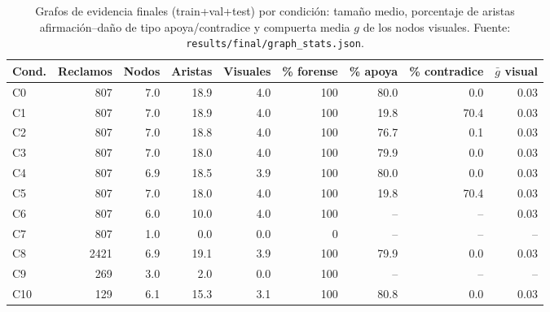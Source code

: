 \begin{table}[H]\centering\scriptsize
\begin{tabular}{lrrrrrrrr}
\toprule
Cond. & Reclamos & Nodos & Aristas & Visuales & \% forense & \% apoya & \% contradice & $\bar g$ visual \\
\midrule
C0 & 807 & 7.0 & 18.9 & 4.0 & 100 & 80.0 & 0.0 & 0.03 \\
C1 & 807 & 7.0 & 18.9 & 4.0 & 100 & 19.8 & 70.4 & 0.03 \\
C2 & 807 & 7.0 & 18.8 & 4.0 & 100 & 76.7 & 0.1 & 0.03 \\
C3 & 807 & 7.0 & 18.0 & 4.0 & 100 & 79.9 & 0.0 & 0.03 \\
C4 & 807 & 6.9 & 18.5 & 3.9 & 100 & 80.0 & 0.0 & 0.03 \\
C5 & 807 & 7.0 & 18.0 & 4.0 & 100 & 19.8 & 70.4 & 0.03 \\
C6 & 807 & 6.0 & 10.0 & 4.0 & 100 & -- & -- & 0.03 \\
C7 & 807 & 1.0 & 0.0 & 0.0 & 0 & -- & -- & -- \\
C8 & 2421 & 6.9 & 19.1 & 3.9 & 100 & 79.9 & 0.0 & 0.03 \\
C9 & 269 & 3.0 & 2.0 & 0.0 & 100 & -- & -- & -- \\
C10 & 129 & 6.1 & 15.3 & 3.1 & 100 & 80.8 & 0.0 & 0.03 \\
\bottomrule
\end{tabular}
\caption{Grafos de evidencia finales (train+val+test) por condición: tamaño medio, porcentaje de aristas afirmación--daño de tipo apoya/contradice y compuerta media $g$ de los nodos visuales. Fuente: \texttt{results/final/graph\_stats.json}.}
\label{tab:grafo}
\end{table}
